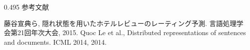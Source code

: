 \documentclass[unicode,10pt]{beamer}
\newcommand{\mycolumnwidth}{0.495\textwidth}
\begin{document}
\begin{frame}
\begin{columns}[onlytextwidth,t]
\begin{column}{\mycolumnwidth}
  参考文献
  
  \begin{thebibliography}{9}
      藤谷宣典ら,
      隠れ状態を用いたホテルレビューのレーティング予測.
      言語処理学会第21回年次大会, 2015.
      Quoc Le et al.,
      Distributed representations of sentences and documents.
      ICML 2014, 2014.
  \end{thebibliography}
\end{column}

\end{columns}
\end{frame}
\end{document}
